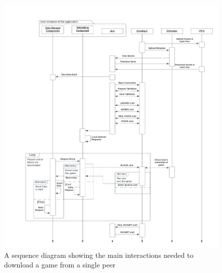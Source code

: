 \begin{figure}[H]
  \centering
  \includegraphics[width=\textwidth]{assets/images/diagrams/p2p-sequence.png}
  \caption{A sequence diagram showing the main interactions needed to download a game from a single peer}
  \label{fig:p2p-interactions}
\end{figure}

